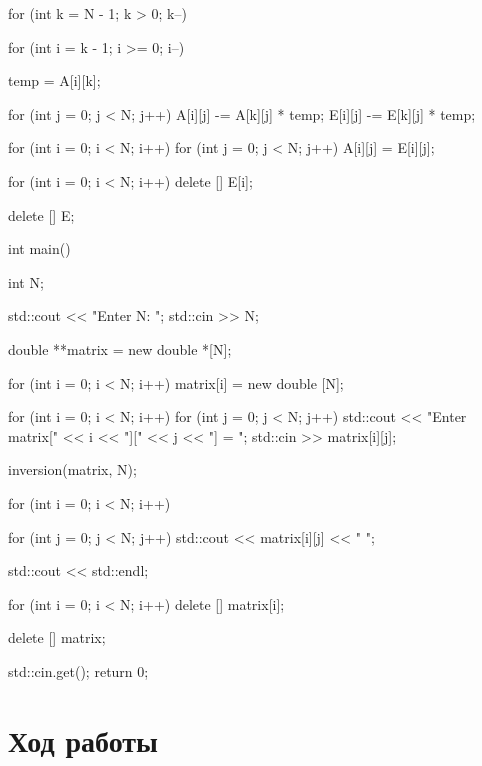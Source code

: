 \documentclass[12pt,a4paper]{scrartcl}
\begin{document}
\begin{enumerate}
{    for (int k = N - 1; k > 0; k--)
    {
        for (int i = k - 1; i >= 0; i--)
        {
            temp = A[i][k];
 
            for (int j = 0; j < N; j++)
            {
                A[i][j] -= A[k][j] * temp;
                E[i][j] -= E[k][j] * temp;
            }
        }
    }
 
    for (int i = 0; i < N; i++)
        for (int j = 0; j < N; j++)
            A[i][j] = E[i][j];
 
    for (int i = 0; i < N; i++)
        delete [] E[i];
 
    delete [] E;
}
 
int main()
{
    int N;
 
    std::cout << "Enter N: ";
    std::cin >> N;
 
    double **matrix = new double *[N];
 
    for (int i = 0; i < N; i++)
        matrix[i] = new double [N];
 
    for (int i = 0; i < N; i++)
        for (int j = 0; j < N; j++)
        {
            std::cout << "Enter matrix[" << i << "][" << j << "] = ";
            std::cin >> matrix[i][j];
        }
 
    inversion(matrix, N);
 
    for (int i = 0; i < N; i++)
    {
        for (int j = 0; j < N; j++)
            std::cout << matrix[i][j] << "  ";
 
        std::cout << std::endl;
    }
 
    for (int i = 0; i < N; i++)
        delete [] matrix[i];
 
    delete [] matrix;
 
    std::cin.get();
    return 0;
}
\end{enumerate}


\section{Ход работы}
\label{sec:exp}
\end{document}
